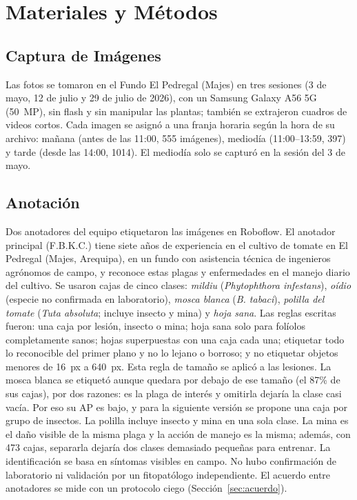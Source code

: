 \documentclass[sensors,article,submit,pdftex,moreauthors]{Definitions/mdpi}
\begin{document}
\section{Materiales y Métodos}

\subsection{Captura de Imágenes}

Las fotos se tomaron en el Fundo El Pedregal (Majes) en tres sesiones (3 de mayo, 12 de julio y 29 de julio de 2026), con un Samsung Galaxy A56 5G (50~MP), sin flash y sin manipular las plantas; también se extrajeron cuadros de videos cortos. Cada imagen se asignó a una franja horaria según la hora de su archivo: mañana (antes de las 11:00, 555 imágenes), mediodía (11:00--13:59, 397) y tarde (desde las 14:00, 1014). El mediodía solo se capturó en la sesión del 3 de mayo.

\subsection{Anotación}\label{sec:anotacion}

Dos anotadores del equipo etiquetaron las imágenes en Roboflow. El anotador principal (F.B.K.C.) tiene siete años de experiencia en el cultivo de tomate en El Pedregal (Majes, Arequipa), en un fundo con asistencia técnica de ingenieros agrónomos de campo, y reconoce estas plagas y enfermedades en el manejo diario del cultivo. Se usaron cajas de cinco clases: \emph{mildiu} (\emph{Phytophthora infestans}), \emph{oídio} (especie no confirmada en laboratorio), \emph{mosca blanca} (\emph{B. tabaci}), \emph{polilla del tomate} (\emph{Tuta absoluta}; incluye insecto y mina) y \emph{hoja sana}. Las reglas escritas fueron: una caja por lesión, insecto o mina; hoja sana solo para folíolos completamente sanos; hojas superpuestas con una caja cada una; etiquetar todo lo reconocible del primer plano y no lo lejano o borroso; y no etiquetar objetos menores de 16~px a 640~px. Esta regla de tamaño se aplicó a las lesiones. La mosca blanca se etiquetó aunque quedara por debajo de ese tamaño (el 87\% de sus cajas), por dos razones: es la plaga de interés y omitirla dejaría la clase casi vacía. Por eso su AP es bajo, y para la siguiente versión se propone una caja por grupo de insectos. La polilla incluye insecto y mina en una sola clase. La mina es el daño visible de la misma plaga y la acción de manejo es la misma; además, con 473 cajas, separarla dejaría dos clases demasiado pequeñas para entrenar. La identificación se basa en síntomas visibles en campo. No hubo confirmación de laboratorio ni validación por un fitopatólogo independiente. El acuerdo entre anotadores se mide con un protocolo ciego (Sección~\ref{sec:acuerdo}).
\end{document}
